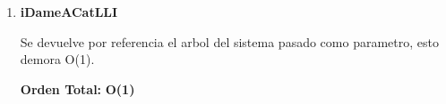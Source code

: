 \vspace*{1em}
\begin{enumerate}








\item\textbf{iDameACatLLI}
\par Se devuelve por referencia el arbol del sistema pasado como parametro, esto demora O(1).
\par\textbf{Orden Total:} \textbf{O(1)}


\end{enumerate}

